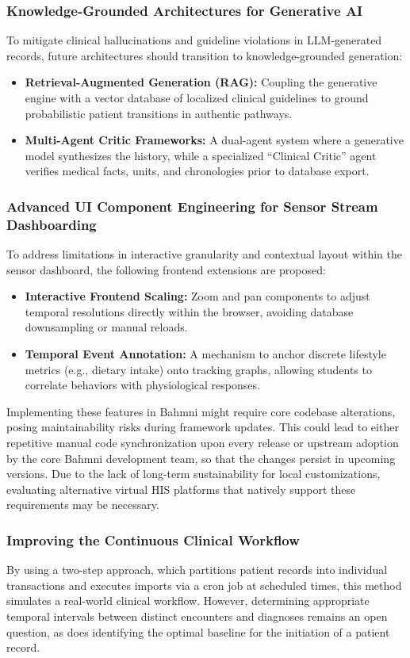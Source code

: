 \subsubsection{Knowledge-Grounded Architectures for Generative AI}
To mitigate clinical hallucinations and guideline violations in LLM-generated records, future architectures should transition to knowledge-grounded generation:
\begin{itemize}
    \item \textbf{Retrieval-Augmented Generation (RAG):} Coupling the generative engine with a vector database of localized clinical guidelines to ground probabilistic patient transitions in authentic pathways.
    \item \textbf{Multi-Agent Critic Frameworks:} A dual-agent system where a generative model synthesizes the history, while a specialized \enquote{Clinical Critic} agent verifies medical facts, units, and chronologies prior to database export.
\end{itemize}

\subsubsection{Advanced UI Component Engineering for Sensor Stream Dashboarding}
To address limitations in interactive granularity and contextual layout within the sensor dashboard, the following frontend extensions are proposed:
\begin{itemize}
    \item \textbf{Interactive Frontend Scaling:} Zoom and pan components to adjust temporal resolutions directly within the browser, avoiding database downsampling or manual reloads.
    \item \textbf{Temporal Event Annotation:} A mechanism to anchor discrete lifestyle metrics (e.g., dietary intake) onto tracking graphs, allowing students to correlate behaviors with physiological responses.
\end{itemize}
Implementing these features in Bahmni might require core codebase alterations, posing maintainability risks during framework updates. This could lead to either repetitive manual code synchronization upon every release or upstream adoption by the core Bahmni development team, so that the changes persist in upcoming versions. Due to the lack of long-term sustainability for local customizations, evaluating alternative virtual HIS platforms that natively support these requirements may be necessary.

\subsubsection{Improving the Continuous Clinical Workflow}
By using a two-step approach, which partitions patient records into individual transactions and executes imports via a cron job at scheduled times, this method simulates a real-world clinical workflow. However, determining appropriate temporal intervals between distinct encounters and diagnoses remains an open question, as does identifying the optimal baseline for the initiation of a patient record. 

